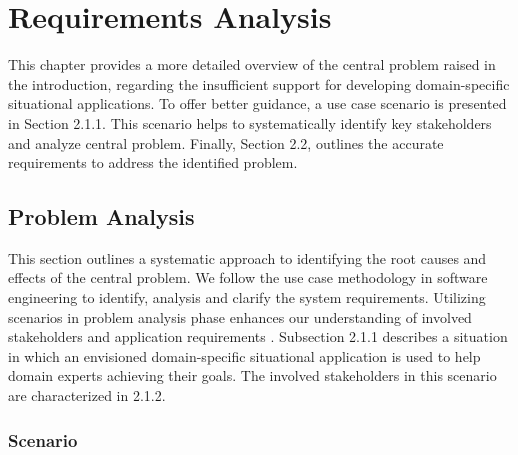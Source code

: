 \hypertarget{sec:requirements-analysis}{%
\chapter{Requirements Analysis}\label{sec:requirements-analysis}}

This chapter provides a more detailed overview of the central problem raised in the introduction, regarding the insufficient support for developing domain-specific situational applications. To offer better guidance, a use case scenario is presented in Section 2.1.1. This scenario helps to systematically identify key stakeholders and analyze central problem. Finally, Section 2.2, outlines the accurate requirements to address the identified problem.

\vspace{-15pt}
\hypertarget{sec:problem-analysis}{%
\section{Problem Analysis}\label{sec:problem-analysis}}
\vspace{15pt}

This section outlines a systematic approach to identifying the root causes and effects of the central problem. We follow the use case methodology in software engineering to identify, analysis and clarify the system requirements. Utilizing scenarios in problem analysis phase enhances our understanding of involved stakeholders and application requirements \autocite{Dzida1998}. Subsection 2.1.1 describes a situation in which an envisioned domain-specific situational application is used to help domain experts achieving their goals. The involved stakeholders in this scenario are characterized in 2.1.2.

\vspace{-10pt}
\hypertarget{sec:scenario}{%
\subsection{Scenario}\label{sec:scenario}}
\vspace{10pt}

